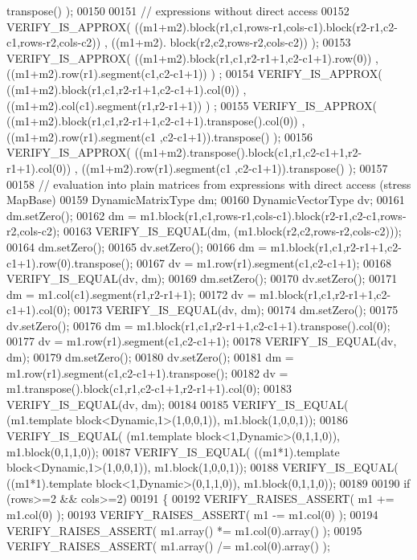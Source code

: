 \begin{DoxyCode}
      transpose() );
00150 
00151   \textcolor{comment}{// expressions without direct access}
00152   VERIFY\_IS\_APPROX( ((m1+m2).block(r1,c1,rows-r1,cols-c1).block(r2-r1,c2-c1,rows-r2,cols-c2)) , ((m1+m2).
      block(r2,c2,rows-r2,cols-c2)) );
00153   VERIFY\_IS\_APPROX( ((m1+m2).block(r1,c1,r2-r1+1,c2-c1+1).row(0)) , ((m1+m2).row(r1).segment(c1,c2-c1+1)) )
      ;
00154   VERIFY\_IS\_APPROX( ((m1+m2).block(r1,c1,r2-r1+1,c2-c1+1).col(0)) , ((m1+m2).col(c1).segment(r1,r2-r1+1)) )
      ;
00155   VERIFY\_IS\_APPROX( ((m1+m2).block(r1,c1,r2-r1+1,c2-c1+1).transpose().col(0)) , ((m1+m2).row(r1).segment(c1
      ,c2-c1+1)).transpose() );
00156   VERIFY\_IS\_APPROX( ((m1+m2).transpose().block(c1,r1,c2-c1+1,r2-r1+1).col(0)) , ((m1+m2).row(r1).segment(c1
      ,c2-c1+1)).transpose() );
00157 
00158   \textcolor{comment}{// evaluation into plain matrices from expressions with direct access (stress MapBase)}
00159   DynamicMatrixType dm;
00160   DynamicVectorType dv;
00161   dm.setZero();
00162   dm = m1.block(r1,c1,rows-r1,cols-c1).block(r2-r1,c2-c1,rows-r2,cols-c2);
00163   VERIFY\_IS\_EQUAL(dm, (m1.block(r2,c2,rows-r2,cols-c2)));
00164   dm.setZero();
00165   dv.setZero();
00166   dm = m1.block(r1,c1,r2-r1+1,c2-c1+1).row(0).transpose();
00167   dv = m1.row(r1).segment(c1,c2-c1+1);
00168   VERIFY\_IS\_EQUAL(dv, dm);
00169   dm.setZero();
00170   dv.setZero();
00171   dm = m1.col(c1).segment(r1,r2-r1+1);
00172   dv = m1.block(r1,c1,r2-r1+1,c2-c1+1).col(0);
00173   VERIFY\_IS\_EQUAL(dv, dm);
00174   dm.setZero();
00175   dv.setZero();
00176   dm = m1.block(r1,c1,r2-r1+1,c2-c1+1).transpose().col(0);
00177   dv = m1.row(r1).segment(c1,c2-c1+1);
00178   VERIFY\_IS\_EQUAL(dv, dm);
00179   dm.setZero();
00180   dv.setZero();
00181   dm = m1.row(r1).segment(c1,c2-c1+1).transpose();
00182   dv = m1.transpose().block(c1,r1,c2-c1+1,r2-r1+1).col(0);
00183   VERIFY\_IS\_EQUAL(dv, dm);
00184 
00185   VERIFY\_IS\_EQUAL( (m1.template block<Dynamic,1>(1,0,0,1)), m1.block(1,0,0,1));
00186   VERIFY\_IS\_EQUAL( (m1.template block<1,Dynamic>(0,1,1,0)), m1.block(0,1,1,0));
00187   VERIFY\_IS\_EQUAL( ((m1*1).\textcolor{keyword}{template} block<Dynamic,1>(1,0,0,1)), m1.block(1,0,0,1));
00188   VERIFY\_IS\_EQUAL( ((m1*1).\textcolor{keyword}{template} block<1,Dynamic>(0,1,1,0)), m1.block(0,1,1,0));
00189 
00190   \textcolor{keywordflow}{if} (rows>=2 && cols>=2)
00191   \{
00192     VERIFY\_RAISES\_ASSERT( m1 += m1.col(0) );
00193     VERIFY\_RAISES\_ASSERT( m1 -= m1.col(0) );
00194     VERIFY\_RAISES\_ASSERT( m1.array() *= m1.col(0).array() );
00195     VERIFY\_RAISES\_ASSERT( m1.array() /= m1.col(0).array() );

\end{DoxyCode}
